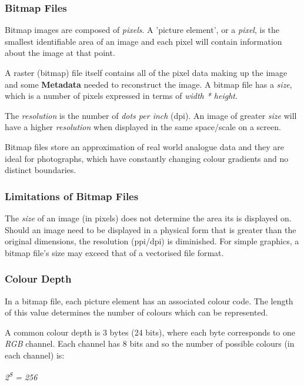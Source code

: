 \documentclass[9pt]{article}
\begin{document}
\subsubsection{Bitmap Files}
\label{sec:org639c12a}

Bitmap images are composed of \emph{pixels}. A 'picture element', or a \emph{pixel}, is the smallest identifiable area of an image and each pixel will contain information about the image at that point.

A raster (bitmap) file itself contains all of the pixel data making up the image and some \textbf{Metadata} needed to reconstruct the image. A bitmap file has a \emph{size}, which is a number of pixels expressed in terms of \emph{width * height}.

The \emph{resolution} is the number of \emph{dots per inch} (dpi). An image of greater \emph{size} will have a higher \emph{resolution} when displayed in the same space/scale on a screen.

Bitmap files store an approximation of real world analogue data and they are ideal for photographs, which have constantly changing colour gradients and no distinct boundaries.

\subsubsection{Limitations of Bitmap Files}
\label{sec:orga52c603}

The \emph{size} of an image (in pixels) does not determine the area its is displayed on. Should an image need to be displayed in a physical form that is greater than the original dimensions, the resolution (ppi/dpi) is diminished. For simple graphics, a bitmap file's size may exceed that of a vectorised file format.

\subsubsection{Colour Depth}
\label{sec:orgfdd7847}

In a bitmap file, each picture element has an associated colour code. The length of this value determines the number of colours which can be represented.

A common colour depth is 3 bytes (24 bits), where each byte corresponds to one \emph{RGB} channel. Each channel has 8 bits and so the number of possible colours (in each channel) is:

\emph{2\textsuperscript{8} = 256}
\end{document}

